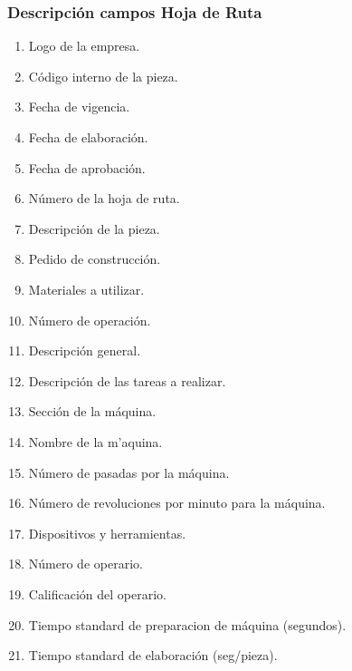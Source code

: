 \subsubsection{Descripción campos Hoja de Ruta}
\begin{enumerate}
 \item Logo de la empresa.
 \item C\'odigo interno de la pieza.
 \item Fecha de vigencia.
 \item Fecha de elaboraci\'on.
 \item Fecha de aprobaci\'on.
 \item Número de la hoja de ruta.
 \item Descripci\'on de la pieza.
 \item Pedido de construcci\'on.
 \item Materiales a utilizar.
 \item N\'umero de operaci\'on.
 \item Descripci\'on general.
 \item Descripci\'on de las tareas a realizar.
 \item Secci\'on de la m\'aquina. 
 \item Nombre de la m'aquina.
 \item N\'umero de pasadas por la m\'aquina.
 \item N\'umero de revoluciones por minuto para la m\'aquina.
 \item Dispositivos y herramientas.
 \item N\'umero de operario.
 \item Calificaci\'on del operario.
 \item Tiempo standard de preparacion de m\'aquina (segundos).
 \item Tiempo standard de elaboraci\'on (seg/pieza).
\end{enumerate}


\pagebreak
